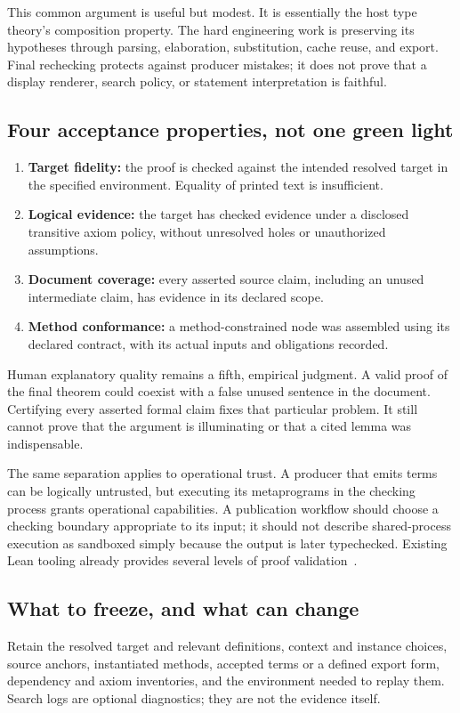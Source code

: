 \documentclass[11pt,letterpaper]{article}
\begin{document}
This common argument is useful but modest. It is essentially the host type
theory's composition property. The hard engineering work is preserving its
hypotheses through parsing, elaboration, substitution, cache reuse, and export.
Final rechecking protects against producer mistakes; it does not prove that a
display renderer, search policy, or statement interpretation is faithful.

\subsection{Four acceptance properties, not one green light}
\begin{enumerate}
\item \textbf{Target fidelity:} the proof is checked against the intended resolved
  target in the specified environment. Equality of printed text is insufficient.
\item \textbf{Logical evidence:} the target has checked evidence under a disclosed
  transitive axiom policy, without unresolved holes or unauthorized assumptions.
\item \textbf{Document coverage:} every asserted source claim, including an unused
  intermediate claim, has evidence in its declared scope.
\item \textbf{Method conformance:} a method-constrained node was assembled using
  its declared contract, with its actual inputs and obligations recorded.
\end{enumerate}
Human explanatory quality remains a fifth, empirical judgment. A valid proof of
the final theorem could coexist with a false unused sentence in the document.
Certifying every asserted formal claim fixes that particular problem. It still cannot prove
that the argument is illuminating or that a cited lemma was indispensable.

The same separation applies to operational trust. A producer that emits terms
can be logically untrusted, but executing its metaprograms in the checking
process grants operational capabilities. A publication workflow should choose a
checking boundary appropriate to its input; it should not describe shared-process
execution as sandboxed simply because the output is later typechecked. Existing
Lean tooling already provides several levels of proof validation~\cite{lean-validation}.

\subsection{What to freeze, and what can change}
Retain the resolved target and relevant definitions, context and instance choices,
source anchors, instantiated methods, accepted terms or a defined export form,
dependency and axiom inventories, and the environment needed to replay them.
Search logs are optional diagnostics; they are not the evidence itself.
\end{document}
